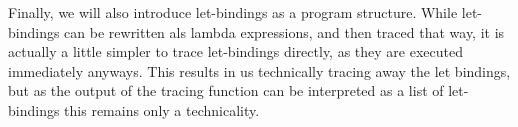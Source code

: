         \begin{prooftree}
        \end{prooftree}

        \begin{prooftree}
        \end{prooftree}

        \begin{prooftree}
        \end{prooftree}

        Finally, we will also introduce let-bindings as a program structure.
        While let-bindings can be rewritten als lambda expressions, and then traced that way, it is actually a little simpler to trace let-bindings directly, as they are executed immediately anyways.
        This results in us technically tracing away the let bindings, but as the output of the tracing function can be interpreted as a list of let-bindings this remains only a technicality.

        \begin{prooftree}
        \end{prooftree}

        \begin{prooftree}
        \end{prooftree}
        
